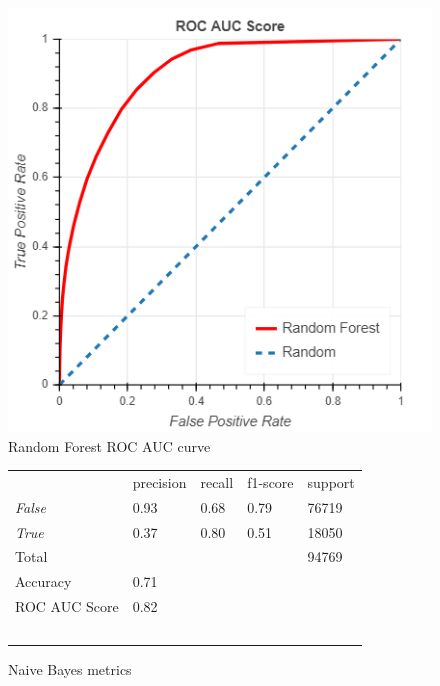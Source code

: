 \documentclass[10pt, conference, compsocconf]{IEEEtran}
\begin{document}
\begin{figure}
  \includegraphics[scale=0.45]{random_forest_roc}
  \centering
  \caption{Random Forest ROC AUC curve}
  \label{fig:random_forest_roc}
\end{figure}

\begin{figure}
  \begin{tabular}{lllll}
                  & precision & recall      & f1-score  & support \\
  \textit{False}  & 0.93      & 0.68        & 0.79      & 76719 \\
  \textit{True}   & 0.37      & 0.80        & 0.51      & 18050 \\
  Total			      &           &             &           & 94769 \\
  Accuracy        & 0.71 \\
  ROC AUC Score	  & 0.82 \\\
  \end{tabular}
  \caption{Naive Bayes metrics}
  \label{fig:naive_bayes_metrics}
\end{figure}
\end{document}
